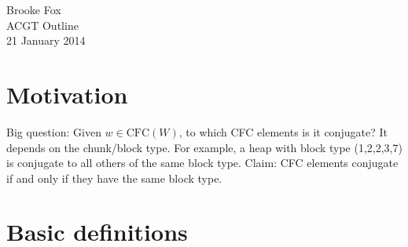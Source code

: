 \documentclass{article}
\newcommand{\CFC}{\text{CFC}(W)}
\theoremstyle{definition}
\theoremstyle{theorem}
\begin{document}
\noindent Brooke Fox \\
ACGT Outline \\
21 January 2014 \\

\section{Motivation}
    Big question: Given $w \in \CFC$, to which CFC elements is it conjugate? It depends on the chunk/block type. For example, a heap with block type (1,2,2,3,7) is conjugate to all others of the same block type.
    Claim: CFC elements conjugate if and only if they have the same block type.

\section{Basic definitions} 
\end{document}
